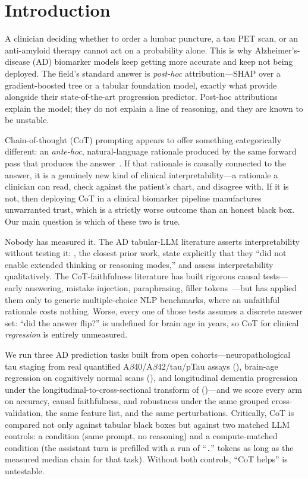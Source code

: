 \section{Introduction}
\label{sec:intro}

A clinician deciding whether to order a lumbar puncture, a tau PET scan, or an anti-amyloid therapy
cannot act on a probability alone. This is why Alzheimer's-disease (AD) biomarker models keep
getting more accurate and keep not being deployed. The field's standard answer is \emph{post-hoc}
attribution---SHAP over a gradient-boosted tree or a tabular foundation model, exactly what
\citet{ding2025l2ctabpfn} provide alongside their state-of-the-art progression predictor. Post-hoc
attributions explain the model; they do not explain a line of reasoning, and they are known to be
unstable.

Chain-of-thought (CoT) prompting appears to offer something categorically different: an
\emph{ante-hoc}, natural-language rationale produced by the same forward pass that produces the
answer~\citep{wei2022cot}. If that rationale is causally connected to the answer, it is a genuinely
new kind of clinical interpretability---a rationale a clinician can read, check against the
patient's chart, and disagree with. If it is not, then deploying CoT in a clinical biomarker
pipeline manufactures unwarranted trust, which is a strictly worse outcome than an honest black box.
Our main question is which of these two is true.

 Nobody has measured it. The AD tabular-LLM literature asserts interpretability
without testing it: \citet{kearney2026tapgpt}, the closest prior work, state explicitly that they
``did not enable extended thinking or reasoning modes,'' and assess interpretability qualitatively.
The CoT-faithfulness literature has built rigorous causal tests---early answering, mistake
injection, paraphrasing, filler tokens~\citep{lanham2023faithfulness}---but has applied them only to
generic multiple-choice NLP benchmarks, where an unfaithful rationale costs nothing. Worse, every
one of those tests assumes a discrete answer set: ``did the answer flip?'' is undefined for brain
age in years, so CoT for clinical \emph{regression} is entirely unmeasured.

 We run three AD prediction tasks built from open cohorts---neuropathological tau
staging from real quantified A$\beta$40/A$\beta$42/tau/pTau assays (\taskone), brain-age regression
on cognitively normal scans (\tasktwo), and longitudinal dementia progression under the
longitudinal-to-cross-sectional transform of \citet{ding2025l2ctabpfn} (\taskthree)---and we score
every arm on accuracy, causal faithfulness, and robustness under the same grouped cross-validation,
the same feature list, and the same perturbations. Critically, CoT is compared not only against
tabular black boxes but against two matched LLM controls: a \direct condition (same prompt, no
reasoning) and a compute-matched \filler condition (the assistant turn is prefilled with a run of
``\texttt{.}'' tokens as long as the measured median chain for that task). Without both controls,
``CoT helps'' is untestable.

